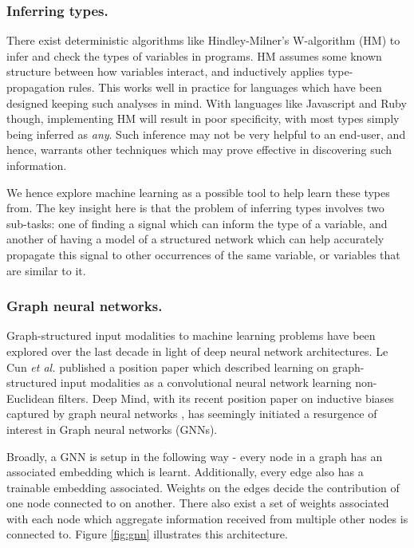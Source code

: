 \subsubsection{Inferring types.}
There exist deterministic algorithms like Hindley-Milner's W-algorithm (HM) to infer and check the types of variables in programs. HM assumes some known structure between how variables interact, and inductively applies type-propagation rules. This works well in practice for languages which have been designed keeping such analyses in mind. With languages like Javascript and Ruby though, implementing HM will result in poor specificity, with most types simply being inferred as \textit{any}. Such inference may not be very helpful to an end-user, and hence, warrants other techniques which may prove effective in discovering such information.

We hence explore machine learning as a possible tool to help learn these types from. The key insight here is that the problem of inferring types involves two sub-tasks: one of finding a signal which can inform the type of a variable, and another of having a model of a structured network which can help accurately propagate this signal to other occurrences of the same variable, or variables that are similar to it.

\subsubsection{Graph neural networks.}
Graph-structured input modalities to machine learning problems have been explored over the last decade in light of deep neural network architectures. Le Cun \textit{et al.} published a position paper \cite{henaff2015deep} which described learning on graph-structured input modalities as a convolutional neural network learning non-Euclidean filters. Deep Mind, with its recent position paper on inductive biases captured by graph neural networks \cite{deepmind2018graph}, has seemingly initiated a resurgence of interest in Graph neural networks (GNNs).

Broadly, a GNN is setup in the following way - every node in a graph has an associated embedding which is learnt. Additionally, every edge also has a trainable embedding associated. Weights on the edges decide the contribution of one node connected to on another. There also exist a set of weights associated with each node which aggregate information received from multiple other nodes is connected to. Figure \ref{fig:gnn} illustrates this architecture.

